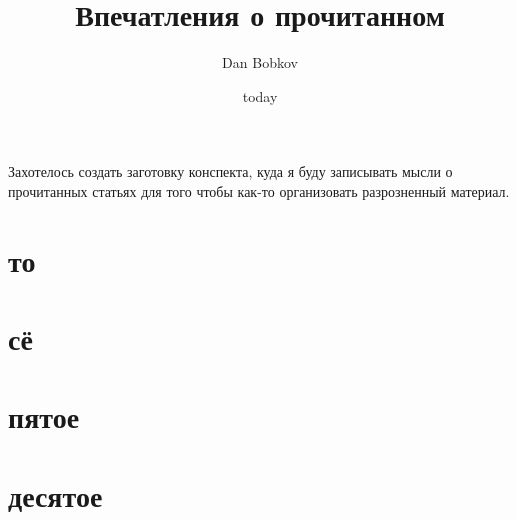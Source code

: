 \documentclass[a4paper,12pt]{article}
\title{Впечатления о прочитанном}
\author{Dan Bobkov}
\date{today}
\begin{document}
\maketitle

Захотелось создать заготовку конспекта, куда я буду записывать мысли о прочитанных статьях для того чтобы как-то организовать разрозненный материал.

\section{то}

\section{сё}

\section{пятое}

\section{десятое}



\end{document}
